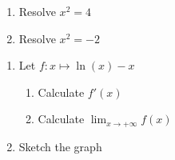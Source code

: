 \begin{enumerate}
    \item Resolve $x^2=4$
    \item Resolve $x^2=-2$
\end{enumerate}

\begin{enumerate}
    \item Let $f: x \mapsto \ln(x)-x$
    \begin{enumerate}
        \item Calculate $f'(x)$
        \item Calculate $\displaystyle\lim_{x\to +\infty}f(x)$
    \end{enumerate}
    \item Sketch the graph
\end{enumerate}